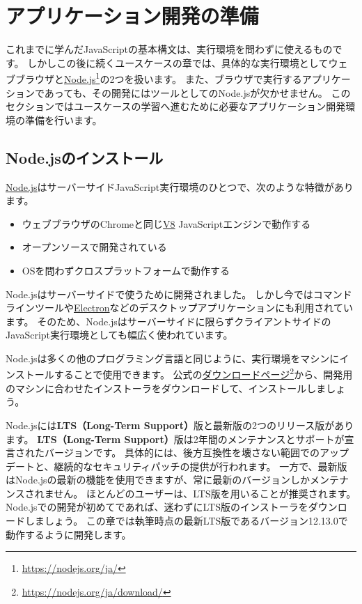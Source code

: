 \hypertarget{setup-local-env}{%
\chapter{アプリケーション開発の準備}\label{setup-local-env}}
\thispagestyle{frontheadings}

これまでに学んだJavaScriptの基本構文は、実行環境を問わずに使えるものです。
しかしこの後に続くユースケースの章では、具体的な実行環境としてウェブブラウザと\href{https://nodejs.org/ja/}{Node.js}\footnote{\url{https://nodejs.org/ja/}}の2つを扱います。
また、ブラウザで実行するアプリケーションであっても、その開発にはツールとしてのNode.jsが欠かせません。
このセクションではユースケースの学習へ進むために必要なアプリケーション開発環境の準備を行います。

\hypertarget{install-nodejs}{%
\section{Node.jsのインストール}\label{install-nodejs}}

\href{https://nodejs.org/ja/}{Node.js}はサーバーサイドJavaScript実行環境のひとつで、次のような特徴があります。

\begin{itemize}
\item
  ウェブブラウザのChromeと同じ\href{https://developers.google.com/v8/}{V8}
  JavaScriptエンジンで動作する
\item
  オープンソースで開発されている
\item
  OSを問わずクロスプラットフォームで動作する
\end{itemize}

Node.jsはサーバーサイドで使うために開発されました。
しかし今ではコマンドラインツールや\href{http://electron.atom.io/}{Electron}などのデスクトップアプリケーションにも利用されています。
そのため、Node.jsはサーバーサイドに限らずクライアントサイドのJavaScript実行環境としても幅広く使われています。

Node.jsは多くの他のプログラミング言語と同じように、実行環境をマシンにインストールすることで使用できます。
公式の\href{https://nodejs.org/ja/download/}{ダウンロードページ}\footnote{\url{https://nodejs.org/ja/download/}}から、開発用のマシンに合わせたインストーラをダウンロードして、インストールしましょう。

Node.jsには\textbf{LTS（Long-Term
Support）}版と最新版の2つのリリース版があります。 \textbf{LTS（Long-Term
Support）}版は2年間のメンテナンスとサポートが宣言されたバージョンです。
具体的には、後方互換性を壊さない範囲でのアップデートと、継続的なセキュリティパッチの提供が行われます。
一方で、最新版はNode.jsの最新の機能を使用できますが、常に最新のバージョンしかメンテナンスされません。
ほとんどのユーザーは、LTS版を用いることが推奨されます。Node.jsでの開発が初めてであれば、迷わずにLTS版のインストーラをダウンロードしましょう。
この章では執筆時点の最新LTS版であるバージョン12.13.0で動作するように開発します。

